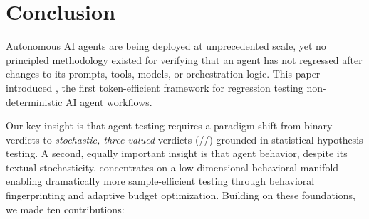 
\section{Conclusion}
\label{sec:conclusion}

Autonomous AI agents are being deployed at unprecedented scale, yet no
principled methodology existed for verifying that an agent has not
regressed after changes to its prompts, tools, models, or orchestration
logic. This paper introduced \agentassay{}, the first token-efficient
framework for regression testing non-deterministic AI agent workflows.

Our key insight is that agent testing requires a paradigm shift from
binary verdicts to \emph{stochastic, three-valued} verdicts
(\PASS{}/\FAIL{}/\INCONC{}) grounded in statistical hypothesis testing.
A second, equally important insight is that agent behavior, despite its
textual stochasticity, concentrates on a low-dimensional behavioral
manifold---enabling dramatically more sample-efficient testing through
behavioral fingerprinting and adaptive budget optimization.
Building on these foundations, we made ten contributions:

